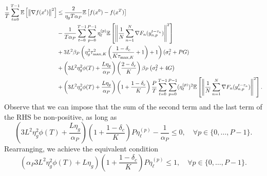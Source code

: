 \begin{equation}
    \label{eq:long-expansion}
    \begin{aligned}
        \frac{1}{T} \sum_{t=0}^{T-1} \mathbb{E}\left[\left\lVert\nabla f(x^t)\right\rVert^2\right] & \leq \frac{2}{\eta_g T \alpha_P}\mathbb{E}\left[f(x^{0}) - f(x^T)\right]                                                                                                                                                                                                   \\
                                                                    & - \frac{1}{T\alpha_P} \sum_{t=0}^{T-1} \sum_{p=0}^{P-1}\eta_{\ell}^{(p)} \mathbb{E}\left[\left\lVert\frac{1}{N}\sum_{n = 1}^N \nabla F_n(y^{t-\tau_n}_{n,p})\right\rVert^2\right]                                                                                                          \\
                                                                    & + 3 L^2 \beta_P \left( \eta^2_g \tau_{\max,K}^2 \left (\frac{1-\delta_c}{K \tau_{\max, K}} + 1 \right) + 1\right)  (\sigma_{\ell}^2 + PG)                                                                                                                   \\
                                                                    & +  \left( 3L^2 \eta_g^2 \phi(T) + \frac{L \eta_g}{\alpha_P} \right) \left(\frac{2-\delta_c}{K}\right)\beta_P \left(\sigma_{\ell}^2 + 4G\right)                                                                                                              \\
                                                                    & + \left( 3L^2 \eta_g^2 \phi(T) + \frac{L \eta_g}{\alpha_P} \right) \left(1 + \frac{1-\delta_c}{K}\right)\frac{P}{T}\sum_{t=0}^{T-1}   \sum_{p=0}^{P-1}   (\eta^{(p)}_{\ell})^2 \mathbb{E}\left[\left\lVert\frac{1}{N} \sum_{n = 1}^N \nabla F_n(y^{t-\tau_n}_{n,p}) \right\rVert^2\right].
    \end{aligned}
\end{equation}
Observe that we can impose that the sum of the second term and the last term of the RHS be non-positive, as long as
\begin{equation}
    \left( 3L^2 \eta_g^2 \phi(T) + \frac{L \eta_g}{\alpha_P} \right) \left(1 + \frac{1-\delta_c}{K}\right)P \eta^{(p)}_{\ell} - \frac{1}{\alpha_P} \leq 0, \quad \forall p \in \{0, \ldots, P-1\}.
\end{equation}
Rearranging, we achieve the equivalent condition
\begin{equation}
    \label{eq:condition}
    \left(\alpha_P 3L^2 \eta_g^2 \phi(T) + L \eta_g \right) \left(1 + \frac{1-\delta_c}{K}\right)P \eta^{(p)}_{\ell} \leq 1, \quad \forall p \in \{0, \ldots, P-1\}.
\end{equation}
